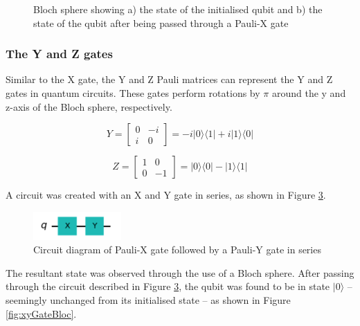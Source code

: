 \begin{figure}[h]
\begin{subfigure}[h]{0.33\textwidth}
        \caption{}
        \label{fig:bSphX2}
    \end{subfigure}
    \captionsetup{font = it, labelfont = bf, width=.91\linewidth, justification=centering}
    \caption{Bloch sphere showing a) the state of the initialised qubit and b) the state of the qubit after being passed through a Pauli-X gate} 
    \label{fig:bSphereXGate}
\end{figure}

\subsubsection{The Y and Z gates}

Similar to the X gate, the Y and Z Pauli matrices can represent the Y and Z gates in quantum circuits. These gates perform rotations by $\pi$ around the y and z-axis of the Bloch sphere, respectively.

$$ Y = \begin{bmatrix} 0 & -i \\ i & 0 \end{bmatrix} = -i|0\rangle\langle1| + i|1\rangle\langle0| $$

$$ Z = \begin{bmatrix} 1 & 0 \\ 0 & -1 \end{bmatrix} = |0\rangle\langle0| - |1\rangle\langle1| $$

A circuit was created with an X and Y gate in series, as shown in Figure \ref{fig:xyGateDiagram}.

\begin{figure}[h]
    \centering
    \includegraphics[width=0.3\textwidth]{lab2/images/xyGate.png}
    \captionsetup{font = it, labelfont = bf, width=.91\linewidth, justification=centering}
    \caption{Circuit diagram of Pauli-X gate followed by a Pauli-Y gate in series} 
    \label{fig:xyGateDiagram}
\end{figure}

The resultant state was observed through the use of a Bloch sphere. After passing through the circuit described in Figure \ref{fig:xyGateDiagram}, the qubit was found to be in state $|0\rangle$ -- seemingly unchanged from its initialised state -- as shown in Figure \ref{fig:xyGateBloc}.

